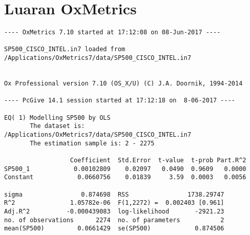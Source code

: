 \section*{Luaran OxMetrics}
\begin{table}
\centering \footnotesize
\begin{verbatim}
---- OxMetrics 7.10 started at 17:12:08 on 08-Jun-2017 ----

SP500_CISCO_INTEL.in7 loaded from /Applications/OxMetrics7/data/SP500_CISCO_INTEL.in7


Ox Professional version 7.10 (OS_X/U) (C) J.A. Doornik, 1994-2014

---- PcGive 14.1 session started at 17:12:18 on  8-06-2017 ----

EQ( 1) Modelling SP500 by OLS
       The dataset is: /Applications/OxMetrics7/data/SP500_CISCO_INTEL.in7
       The estimation sample is: 2 - 2275

                  Coefficient  Std.Error  t-value  t-prob Part.R^2
SP500_1            0.00102809    0.02097   0.0490  0.9609   0.0000
Constant            0.0660756    0.01839     3.59  0.0003   0.0056

sigma                0.874698  RSS                1738.29747
R^2               1.05782e-06  F(1,2272) =  0.002403 [0.961]
Adj.R^2          -0.000439083  log-likelihood       -2921.23
no. of observations      2274  no. of parameters           2
mean(SP500)         0.0661429  se(SP500)            0.874506
\end{verbatim}
\end{table}




